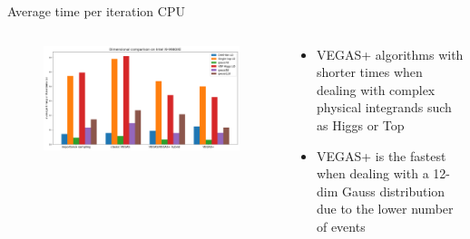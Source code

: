 \documentclass[t,handout,professionalfont,serif]{beamer}
\begin{document}
\begin{frame}{Average time per iteration CPU}
	\tiny
	\begin{columns}
		\begin{column}{0.7 \textwidth}
			\begin{figure}
									\includegraphics[width= \columnwidth]{cpu.png}
			\end{figure}

		\end{column}
	\hspace{-0.5cm}
	\begin{column}{0.3\textwidth}
					\vspace{0.7cm}
					
		\begin{itemize}\setlength\itemsep{5em}

			\item VEGAS+ algorithms with shorter times when dealing with complex physical integrands such as Higgs or Top
		    \item VEGAS+ is the fastest when dealing with a 12-dim Gauss distribution due to the lower number of events
	\end{itemize}
	\end{column}
	\end{columns}


\end{frame}
\end{document}
